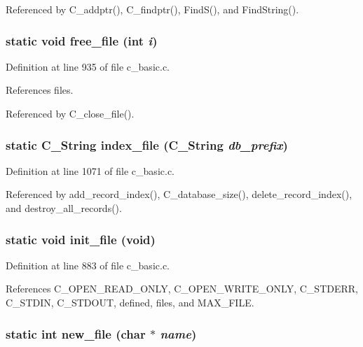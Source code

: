 Referenced by C\_\-addptr(), C\_\-findptr(), Find\-S(), and Find\-String().
\subsubsection{\setlength{\rightskip}{0pt plus 5cm}static void free\_\-file (int {\em i})\hspace{0.3cm}{\tt  [static]}}\label{c__basic_8c_d25f91a4997729460f7d476a524fda35}




Definition at line 935 of file c\_\-basic.c.

References files.

Referenced by C\_\-close\_\-file().
\subsubsection{\setlength{\rightskip}{0pt plus 5cm}static \bf{C\_\-String} index\_\-file (\bf{C\_\-String} {\em db\_\-prefix})\hspace{0.3cm}{\tt  [static]}}\label{c__basic_8c_124e1f537d7d5a017c75f8924c1da004}




Definition at line 1071 of file c\_\-basic.c.

Referenced by add\_\-record\_\-index(), C\_\-database\_\-size(), delete\_\-record\_\-index(), and destroy\_\-all\_\-records().
\subsubsection{\setlength{\rightskip}{0pt plus 5cm}static void init\_\-file (void)\hspace{0.3cm}{\tt  [static]}}\label{c__basic_8c_1338e9edaf3183d267554d007d51eb8c}




Definition at line 883 of file c\_\-basic.c.

References C\_\-OPEN\_\-READ\_\-ONLY, C\_\-OPEN\_\-WRITE\_\-ONLY, C\_\-STDERR, C\_\-STDIN, C\_\-STDOUT, defined, files, and MAX\_\-FILE.
\subsubsection{\setlength{\rightskip}{0pt plus 5cm}static int new\_\-file (char $\ast$ {\em name})\hspace{0.3cm}{\tt  [static]}}\label{c__basic_8c_4f607a54b43b1700d07472cbbdda2181}




